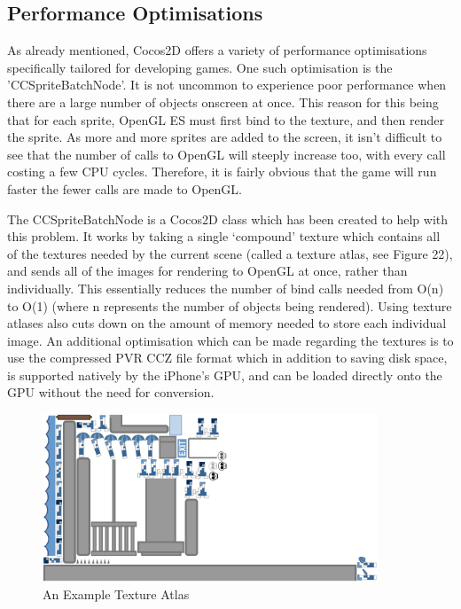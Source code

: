 \documentclass[a4paper,oneside]{report}
\begin{document}
\subsection{Performance Optimisations} 

As already mentioned, Cocos2D offers a variety of performance optimisations specifically tailored for developing games. One such optimisation is the 'CCSpriteBatchNode'. It is not uncommon to experience poor performance when there are a large number of objects onscreen at once. This reason for this being that for each sprite, OpenGL ES must first bind to the texture, and then render the sprite. As more and more sprites are added to the screen, it isn't difficult to see that the number of calls to OpenGL will steeply increase too, with every call costing a few CPU cycles. Therefore, it is fairly obvious that the game will run faster the fewer calls are made to OpenGL. 

The CCSpriteBatchNode is a Cocos2D class which has been created to help with this problem. It works by taking a single `compound' texture which contains all of the textures needed by the current scene (called a texture atlas, see Figure 22), and sends all of the images for rendering to OpenGL at once, rather than individually. This essentially reduces the number of bind calls needed from O(n) to O(1) (where n represents the number of objects being rendered). Using texture atlases also cuts down on the amount of memory needed to store each individual image. An additional optimisation which can be made regarding the textures is to use the compressed PVR CCZ file format which in addition to saving disk space, is supported natively by the iPhone's GPU, and can be loaded directly onto the GPU without the need for conversion.

\begin{figure}[h!]
  \centering
    \includegraphics[width=100mm]{sources/images/Texture_atlas}
    \caption{An Example Texture Atlas}
\end{figure}
\end{document}
